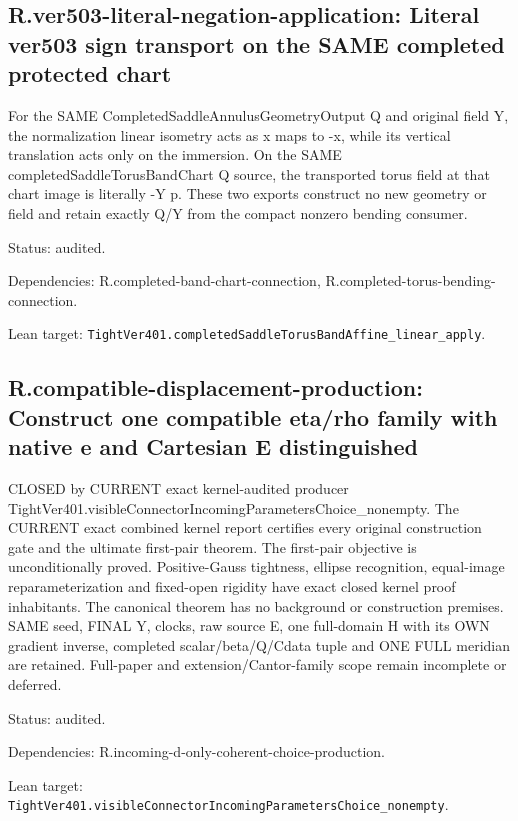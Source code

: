 \documentclass{article}
\begin{document}
\subsection*{R.ver503-literal-negation-application: Literal ver503 sign transport on the SAME completed protected chart}
For the SAME CompletedSaddleAnnulusGeometryOutput Q and original field Y, the normalization linear isometry acts as x maps to -x, while its vertical translation acts only on the immersion. On the SAME completedSaddleTorusBandChart Q source, the transported torus field at that chart image is literally -Y p. These two exports construct no new geometry or field and retain exactly Q/Y from the compact nonzero bending consumer.
\par Status: audited.
\par Dependencies: R.completed-band-chart-connection, R.completed-torus-bending-connection.
\par Lean target: \texttt{TightVer401.completedSaddleTorusBandAffine\_linear\_apply}.
\subsection*{R.compatible-displacement-production: Construct one compatible eta/rho family with native e and Cartesian E distinguished}
CLOSED by CURRENT exact kernel-audited producer TightVer401.visibleConnectorIncomingParametersChoice\_nonempty. The CURRENT exact combined kernel report certifies every original construction gate and the ultimate first-pair theorem. The first-pair objective is unconditionally proved. Positive-Gauss tightness, ellipse recognition, equal-image reparameterization and fixed-open rigidity have exact closed kernel proof inhabitants. The canonical theorem has no background or construction premises. SAME seed, FINAL Y, clocks, raw source E, one full-domain H with its OWN gradient inverse, completed scalar/beta/Q/Cdata tuple and ONE FULL meridian are retained. Full-paper and extension/Cantor-family scope remain incomplete or deferred.
\par Status: audited.
\par Dependencies: R.incoming-d-only-coherent-choice-production.
\par Lean target: \texttt{TightVer401.visibleConnectorIncomingParametersChoice\_nonempty}.
\end{document}
